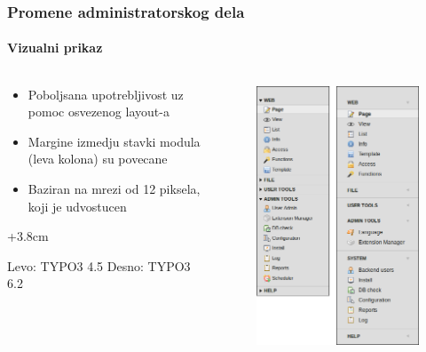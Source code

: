 
\begin{frame}[fragile]
	\frametitle{Promene administratorskog dela}
	\framesubtitle{Vizualni prikaz}

	\begin{columns}[T]

		\begin{column}{.5\textwidth}
			\begin{itemize}
				\item Poboljsana upotrebljivost uz pomoc osvezenog layout-a
				\item Margine izmedju stavki modula (leva kolona) su povecane
				\item Baziran na mrezi od 12 piksela, koji je udvostucen
			\end{itemize}

			\advance\leftskip+3.8cm

			\smaller
				Levo: TYPO3 4.5\newline
				Desno: TYPO3 6.2
			\normalsize
		\end{column}

		\begin{column}{.5\textwidth}
			\begin{figure}\vspace*{-0.4cm}
				\includegraphics[width=0.6\linewidth]{Images/BackendChanges/VisualAppearance.png}
			\end{figure}
		\end{column}

	\end{columns}

\end{frame}

